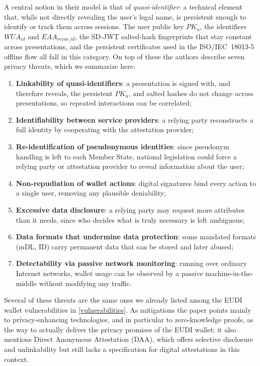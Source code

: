 \documentclass[binding=0.6cm,oneside,noexaminfo]{sapthesis}
\begin{document}
A central notion in their model is that of \emph{quasi-identifier}: a technical element that, while not directly
revealing the user's legal name, is persistent enough to identify or track them across sessions. The user public key
$PK_u$, the identifiers $WUA_{id}$ and $EAA_{revoc\_id}$, the SD-JWT salted-hash fingerprints that stay constant across
presentations, and the persistent certificates used in the ISO/IEC~18013-5 offline flow all fall in this category. On
top of these the authors describe seven privacy threats, which we summarize here:
\begin{enumerate}[noitemsep]
  \item \textbf{Linkability of quasi-identifiers}: a presentation is signed with, and therefore reveals, the persistent $PK_u$, and salted hashes do not change across presentations, so repeated interactions can be correlated;
  \item \textbf{Identifiability between service providers}: a relying party reconstructs a full identity by cooperating with the attestation provider;
  \item \textbf{Re-identification of pseudonymous identities}: since pseudonym handling is left to each Member State, national legislation could force a relying party or attestation provider to reveal information about the user;
  \item \textbf{Non-repudiation of wallet actions}: digital signatures bind every action to a single user, removing any plausible deniability;
  \item \textbf{Excessive data disclosure}: a relying party may request more attributes than it needs, since who decides what is truly necessary is left ambiguous;
  \item \textbf{Data formats that undermine data protection}: some mandated formats (mDL, ID) carry permanent data that can be stored and later abused;
  \item \textbf{Detectability via passive network monitoring}: running over ordinary Internet networks, wallet usage can be observed by a passive machine-in-the-middle without modifying any traffic.
\end{enumerate}
Several of these threats are the same ones we already listed among the EUDI wallet vulnerabilities in
\cref{vulnerabilities}. As mitigations the paper points mainly to privacy-enhancing technologies, and in particular to
zero-knowledge proofs, as the way to actually deliver the privacy promises of the EUDI wallet; it also mentions Direct
Anonymous Attestation (DAA), which offers selective disclosure and unlinkability but still lacks a specification for
digital attestations in this context.
\end{document}
